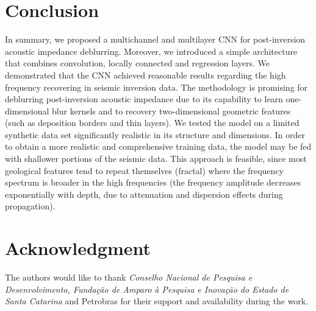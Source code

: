 \documentclass[journal]{IEEEtran}
\begin{document}
\section{Conclusion} \label{Conclusion}
In summary, we proposed a multichannel and multilayer CNN
for post-inversion acoustic impedance deblurring. Moreover, we introduced a simple architecture
that combines convolution, locally connected and regression layers.
We demonstrated that the CNN achieved reasonable results regarding the high frequency
recovering in seismic inversion data. The methodology is promising for deblurring
post-inversion acoustic impedance due to its capability to learn one-dimensional
blur kernels and to recovery two-dimensional geometric features (such as deposition
borders and thin layers). We tested the model on a limited synthetic data set
significantly realistic in its structure and dimensions. 
In order to obtain a more realistic and comprehensive training data, the model
may be fed with shallower portions of the seismic data. This approach is
feasible, since most geological features tend to repeat themselves
(fractal) where the frequency spectrum is broader in the high frequencies (the frequency
amplitude decreases exponentially with depth, due to attenuation and dispersion effects
during propagation).

\section*{Acknowledgment}

The authors would like to thank \textit{Conselho Nacional de Pesquisa e Desenvolvimento,
Fundação de Amparo à Pesquisa e Inovação do Estado de Santa Catarina} and Petrobras
for their support and availability during the work.

\ifCLASSOPTIONcaptionsoff
  \newpage
\fi
\end{document}
